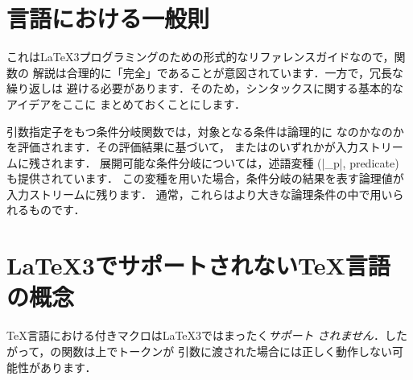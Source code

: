 \documentclass[uplatex,dvipdfmx,full,kernel]{wtpl3doc}
\begin{document}
\section{言語における一般則}

これは\LaTeX3プログラミングのための形式的なリファレンスガイドなので，関数の
解説は合理的に「完全」であることが意図されています．一方で，冗長な繰り返しは
避ける必要があります．そのため，シンタックスに関する基本的なアイデアをここに
まとめておくことにします．

引数指定子をもつ条件分岐関数では，対象となる条件は論理的に
なのかなのかを評価されます．その評価結果に基づいて，
またはのいずれかが入力ストリームに残されます．
展開可能な条件分岐については，述語変種 (|_p|, predicate) も提供されています．
この変種を用いた場合，条件分岐の結果を表す論理値が入力ストリームに残ります．
通常，これらはより大きな論理条件の中で用いられるものです．

\section{\LaTeX3でサポートされない\TeX 言語の概念}

\TeX 言語における付きマクロは\LaTeX3ではまったく\emph{サポート
されません}．したがって，の関数は\LaTeXe 上でトークンが
引数に渡された場合には正しく動作しない可能性があります．
\end{document}

